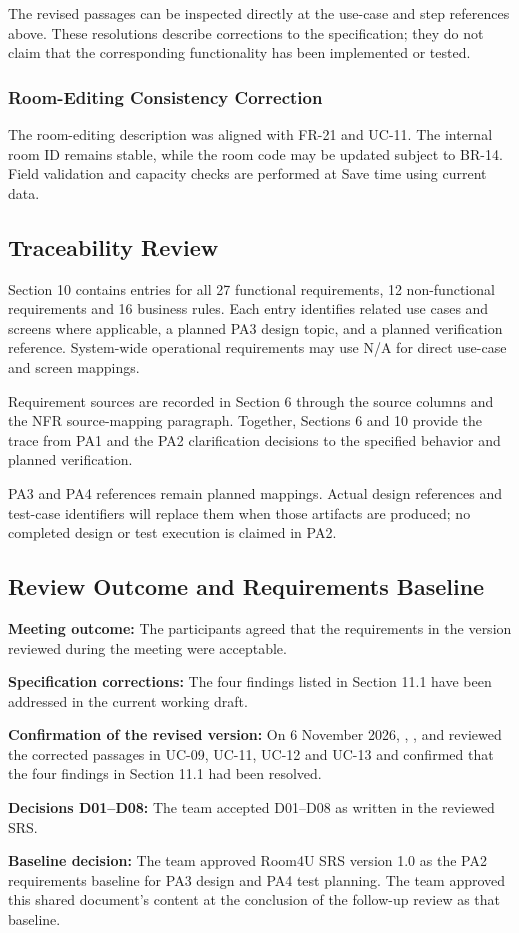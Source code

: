 The revised passages can be inspected directly at the use-case and step references above. These resolutions describe corrections to the specification; they do not claim that the corresponding functionality has been implemented or tested.

\subsubsection*{Room-Editing Consistency Correction}
The room-editing description was aligned with FR-21 and UC-11. The internal room ID remains stable, while the room code may be updated subject to BR-14. Field validation and capacity checks are performed at Save time using current data.

\subsection{Traceability Review}

Section 10 contains entries for all 27 functional requirements, 12 non-functional requirements and 16 business rules. Each entry identifies related use cases and screens where applicable, a planned PA3 design topic, and a planned verification reference. System-wide operational requirements may use N/A for direct use-case and screen mappings.

Requirement sources are recorded in Section 6 through the source columns and the NFR source-mapping paragraph. Together, Sections 6 and 10 provide the trace from PA1 and the PA2 clarification decisions to the specified behavior and planned verification.

PA3 and PA4 references remain planned mappings. Actual design references and test-case identifiers will replace them when those artifacts are produced; no completed design or test execution is claimed in PA2.

\subsection{Review Outcome and Requirements Baseline}

\textbf{Meeting outcome:} The participants agreed that the requirements in the version reviewed during the meeting were acceptable.\par
\textbf{Specification corrections:} The four findings listed in Section 11.1 have been addressed in the current working draft.\par
\textbf{Confirmation of the revised version:} On 6 November 2026, , ,  and  reviewed the corrected passages in UC-09, UC-11, UC-12 and UC-13 and confirmed that the four findings in Section 11.1 had been resolved.\par
\textbf{Decisions D01--D08:} The team accepted D01--D08 as written in the reviewed SRS.\par
\textbf{Baseline decision:} The team approved Room4U SRS version 1.0 as the PA2 requirements baseline for PA3 design and PA4 test planning. The team approved this shared document's content at the conclusion of the follow-up review as that baseline.

\clearpage